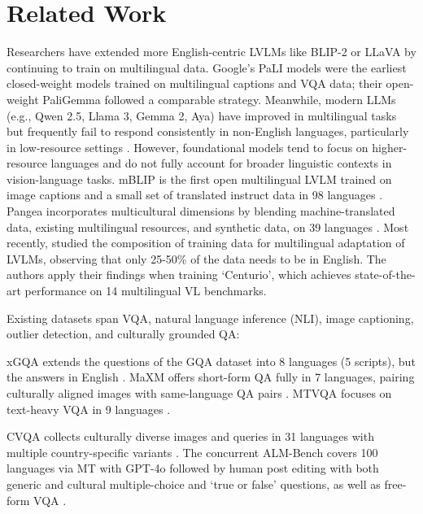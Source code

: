 \section{Related Work}
\label{sec:related}
%

 Researchers have extended more English-centric LVLMs like BLIP-2 or LLaVA by continuing to train on multilingual data. Google’s PaLI models were the earliest closed-weight models trained on multilingual captions and VQA data; their open-weight PaliGemma followed a comparable strategy. Meanwhile, modern LLMs (e.g., Qwen 2.5, Llama 3, Gemma 2, Aya) have improved in multilingual tasks but frequently fail to respond consistently in non-English languages, particularly in low-resource settings \cite{schneider-sitaram-2024-m5}. %
However, foundational models tend to focus on higher-resource languages and do not fully account for broader linguistic contexts in vision-language tasks. mBLIP is the first open multilingual LVLM trained on image captions and a small set of translated instruct data in 98 languages \cite{geigle-etal-2024-mblip}. Pangea incorporates multicultural dimensions by blending machine-translated data, existing multilingual resources, and synthetic data, on 39 languages \cite{yue2024pangea}. Most recently, \citet{geigle2025centurio} studied the composition of training data for multilingual adaptation of LVLMs, observing that only 25-50\% of the data needs to be in English. The authors apply their findings when training `Centurio', which achieves state-of-the-art performance on 14 multilingual VL benchmarks.

Existing datasets span VQA, natural language inference (NLI), image captioning, outlier detection, and culturally grounded QA: 

 xGQA extends the questions of the GQA dataset into 8 languages (5 scripts), but the answers in English \cite{pfeiffer-etal-2022-xgqa}. MaXM offers short-form QA fully in 7 languages, pairing culturally aligned images with same-language QA pairs \cite{changpinyo-etal-2023-maxm}. MTVQA focuses on text-heavy VQA in 9 languages \cite{tang2024mtvqa}.

 CVQA collects culturally diverse images and queries in 31 languages with multiple country-specific variants \cite{romero2024cvqa}. The concurrent ALM-Bench covers 100 languages via MT with GPT-4o followed by human post editing with both generic and cultural multiple-choice and `true or false' questions, as well as free-form VQA \cite{vayani2024alm}.

